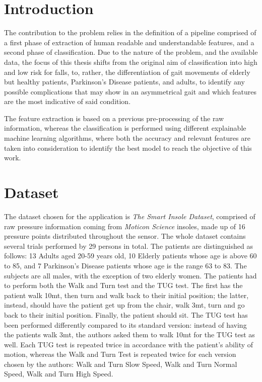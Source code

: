 \section{Introduction}
The contribution to the problem relies in the definition of a pipeline comprised of a first phase of extraction of human readable and understandable features, and a second phase of classification. 
Due to the nature of the problem, and the available data, the focus of this thesis shifts from the original aim of classification into high and low risk for falls, to, rather, the differentiation of gait movements of elderly but healthy patients, Parkinson's Disease patients, and adults, to identify any possible complications that may show in an asymmetrical gait and which features are the most indicative of said condition.

The feature extraction is based on a previous pre-processing of the raw information, whereas the classification is performed using different explainable machine learning algorithms, where both the accuracy and relevant features are taken into consideration to identify the best model to reach the objective of this work.

\section{Dataset}
The dataset chosen for the application is \textit{The Smart Insole Dataset}, comprised of raw pressure information coming from \textit{Moticon Science} insoles, made up of 16 pressure points distributed throughout the sensor. 
The whole dataset contains several trials performed by 29 persons in total. The patients are distinguished as follows: 13 Adults aged 20-59 years old, 10 Elderly patients whose age is above 60 to 85, and 7 Parkinson's Disease patients whose age is the range 63 to 83. The subjects are all males, with the exception of two elderly women.
The patients had to perform both the Walk and Turn test and the TUG test. The first has the patient walk 10mt, then turn and walk back to their initial position; the latter, instead, should have the patient get up from the chair, walk 3mt, turn and go back to their initial position. Finally, the patient should sit. 
The TUG test has been performed differently compared to its standard version: instead of having the patients walk 3mt, the authors asked them to walk 10mt for the TUG test as well. 
Each TUG test is repeated twice in accordance with the patient's ability of motion, whereas the Walk and Turn Test is repeated twice for each version chosen by the authors: Walk and Turn Slow Speed, Walk and Turn Normal Speed, Walk and Turn High Speed.

